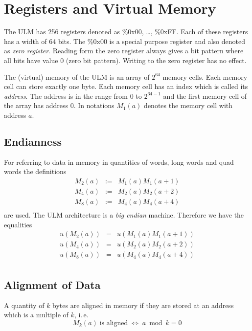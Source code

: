 \documentclass[
   a4paper,
   twoside,
   bringhurst,
   palatino,
   english,
   titlepage,
   fleqn
]{refman}
\begin{document}
    \section{Registers and Virtual Memory}

    The ULM has 256 registers denoted as \%0x00, \dots, \%0xFF. Each of these
    registers has a width of 64 bits. The \%0x00 is a special purpose register
    and also denoted as \textit{zero register}. Reading form the zero register
    always gives a bit pattern where all bits have value 0 (zero bit pattern).
    Writing to the zero register has no effect.


    The (virtual) memory of the ULM is an array of $2^{64}$ memory cells. Each
    memory cell can store exactly one byte. Each memory cell has an index which
    is called its \textit{address}. The address is in the range from $0$ to
    $2^{64-1}$ and the first memory cell of the array has address $0$. In
    notations $M_1(a)$ denotes the memory cell with address $a$.


    \subsection{Endianness}

    For referring to data in memory in quantities of words, long words and quad
    words the definitions
    \[
	\begin{array}{lcl}
	M_2(a) & := & M_1(a) M_1(a+1) \\
	M_4(a) & := & M_2(a) M_2(a+2) \\
	M_8(a) & := & M_4(a) M_4(a+4) \\
	\end{array}
    \]
    are used. The ULM architecture is a \textit{big endian} machine. Therefore
    we have the equalities
    \[
	\begin{array}{lcl}
	u(M_2(a)) & = & u(M_1(a) M_1(a+1)) \\
	u(M_4(a)) & = & u(M_2(a) M_2(a+2)) \\
	u(M_8(a)) & = & u(M_4(a) M_4(a+4)) \\
	\end{array}
    \]


    \subsection{Alignment of Data}

    A quantity of $k$ bytes are aligned in memory if they are stored at an
    address which is a multiple of $k$, i.\,e.
    \[
	M_k(a)\;\text{is aligned}\;\Leftrightarrow\; a \bmod k = 0
    \]
\end{document}
